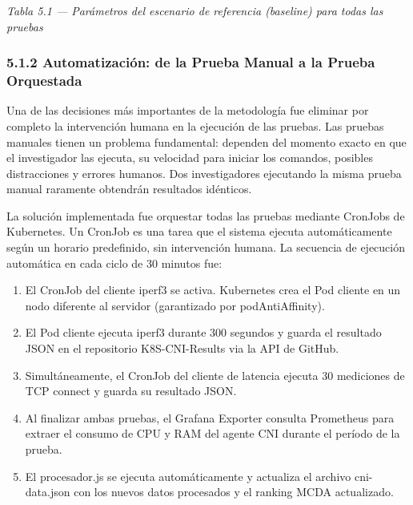 \documentclass[journal]{IEEEtran}
\begin{document}
\begin{center}\emph{\emph{Tabla 5.1 --- Parámetros del escenario de referencia (baseline) para todas las pruebas}}\end{center}

\subsubsection{5.1.2 Automatización: de la Prueba Manual a la Prueba Orquestada}

Una de las decisiones más importantes de la metodología fue eliminar por completo la intervención humana en la ejecución de las pruebas. Las pruebas manuales tienen un problema fundamental: dependen del momento exacto en que el investigador las ejecuta, su velocidad para iniciar los comandos, posibles distracciones y errores humanos. Dos investigadores ejecutando la misma prueba manual raramente obtendrán resultados idénticos.

La solución implementada fue orquestar todas las pruebas mediante CronJobs de Kubernetes. Un CronJob es una tarea que el sistema ejecuta automáticamente según un horario predefinido, sin intervención humana. La secuencia de ejecución automática en cada ciclo de 30 minutos fue:

\begin{enumerate}

\item El CronJob del cliente iperf3 se activa. Kubernetes crea el Pod cliente en un nodo diferente al servidor (garantizado por podAntiAffinity).

\item El Pod cliente ejecuta iperf3 durante 300 segundos y guarda el resultado JSON en el repositorio K8S-CNI-Results via la API de GitHub.

\item Simultáneamente, el CronJob del cliente de latencia ejecuta 30 mediciones de TCP connect y guarda su resultado JSON.

\item Al finalizar ambas pruebas, el Grafana Exporter consulta Prometheus para extraer el consumo de CPU y RAM del agente CNI durante el período de la prueba.

\item El procesador.js se ejecuta automáticamente y actualiza el archivo cni-data.json con los nuevos datos procesados y el ranking MCDA actualizado.

\end{enumerate}
\end{document}

